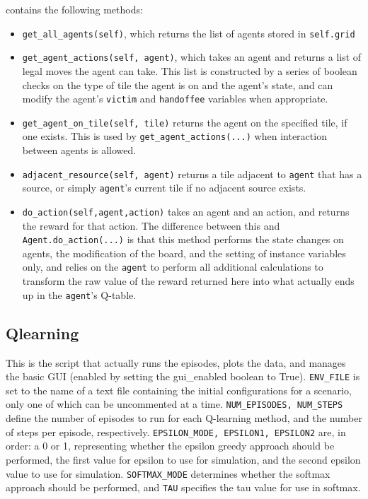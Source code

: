 \documentclass[11pt]{article}
\begin{document}
 contains the following methods:

\begin{itemize}
\item \texttt{get_all_agents(self)}, which returns the list of agents stored in \texttt{self.grid}
\item \texttt{get_agent_actions(self, agent)}, which takes an agent and returns a list of legal moves the agent can take. This list is constructed by a series of boolean checks on the type of tile the agent is on and the agent's state, and can modify the agent's \texttt{victim} and \texttt{handoffee} variables when appropriate.
\item \texttt{get_agent_on_tile(self, tile)} returns the agent on the specified tile, if one exists. This is used by \texttt{get_agent_actions(...)} when interaction between agents is allowed.
\item \texttt{adjacent_resource(self, agent)} returns a tile adjacent to \texttt{agent} that has a source, or simply \texttt{agent}'s current tile if no adjacent source exists.
\item \texttt{do_action(self,agent,action)} takes an agent and an action, and returns the reward for that action. The difference between this and \texttt{Agent.do_action(...)} is that this method performs the state changes on agents, the modification of the board, and the setting of instance variables only, and relies on the \texttt{agent} to perform all additional calculations to transform the raw value of the reward returned here into what actually ends up in the \texttt{agent}'s Q-table.
\end{itemize}

  
\subsection{Qlearning}

This is the script that actually runs the episodes, plots the data, and manages the basic GUI (enabled by setting the gui_enabled boolean to True). \texttt{ENV_FILE} is set to the name of a text file containing the initial configurations for a scenario, only one of which can be uncommented at a time. \texttt{NUM_EPISODES, NUM_STEPS} define the number of episodes to run for each Q-learning method, and the number of steps per episode, respectively. \texttt{EPSILON_MODE, EPSILON1, EPSILON2} are, in order: a 0 or 1, representing whether the epsilon greedy approach should be performed, the first value for epsilon to use for simulation, and the second epsilon value to use for simulation. \texttt{SOFTMAX_MODE} determines whether the softmax approach should be performed, and \texttt{TAU} specifies the tau value for use in softmax.
\end{document}

